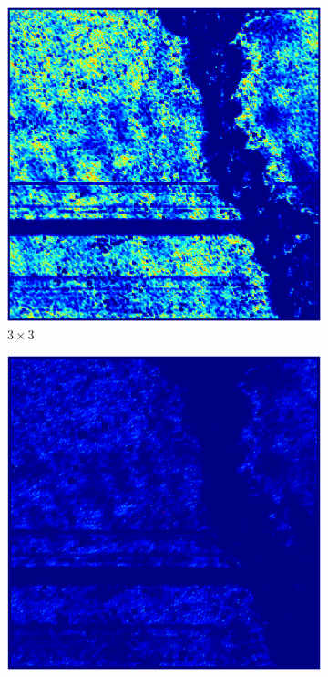 \documentclass[../main.tex]{subfiles}
\begin{document}
	\begin{figure}[ht]
		\centering
		\begin{subfigure}{0.32\linewidth}
			\includegraphics[keepaspectratio, width=\linewidth]{images/nlm_weights_3.png}
			\caption{$3\times3$}
		\end{subfigure}
		\begin{subfigure}{0.32\linewidth}
			\includegraphics[keepaspectratio, width=\linewidth]{images/nlm_weights_5.png}

\end{subfigure}
\end{figure}
\end{document}
